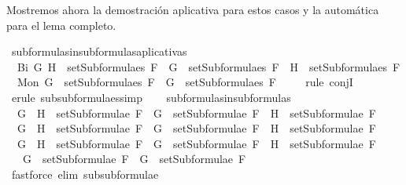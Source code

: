 \begin{isabellebody}
\begin{isamarkuptext}
Mostremos ahora la demostración aplicativa para estos casos y la automática para el lema 
completo.%
\end{isamarkuptext}\isamarkuptrue%
\isamarkupfalse%
\ subformulas{\isacharunderscore}in{\isacharunderscore}subformulas{\isacharunderscore}aplicativa{\isacharunderscore}s{\isacharcolon}\isanewline
\ \ {\isachardoublequoteopen}Bi\ G\ H\ {\isasymin}\ setSubformulae{\isacharunderscore}s\ F\ {\isasymLongrightarrow}\ G\ {\isasymin}\ setSubformulae{\isacharunderscore}s\ F\ {\isasymand}\ H\ {\isasymin}\ setSubformulae{\isacharunderscore}s\ F{\isachardoublequoteclose}\isanewline
\ \ {\isachardoublequoteopen}Mon\ G\ {\isasymin}\ setSubformulae{\isacharunderscore}s\ F\ {\isasymLongrightarrow}\ G\ {\isasymin}\ setSubformulae{\isacharunderscore}s\ F{\isachardoublequoteclose}\isanewline
%
\isadelimproof
\ \ \ %
\endisadelimproof
%
\isatagproof
{}\isamarkupfalse%
\ {\isacharparenleft}rule\ conjI{\isacharparenright}\isanewline
\ \ \ \isamarkupfalse%
\ {\isacharparenleft}erule\ subsubformulae{\isacharunderscore}s{\isacharcomma}simp{\isacharparenright}{\isacharplus}\isanewline
\ \ \isamarkupfalse%
%
\endisatagproof
{\isafoldproof}%
%
\isadelimproof
\isanewline
%
\endisadelimproof
\isanewline
{}\isamarkupfalse%
\ subformulas{\isacharunderscore}in{\isacharunderscore}subformulas{\isacharcolon}\isanewline
\ \ {\isachardoublequoteopen}G\ \isactrlbold {\isasymand}\ H\ {\isasymin}\ setSubformulae\ F\ {\isasymLongrightarrow}\ G\ {\isasymin}\ setSubformulae\ F\ {\isasymand}\ H\ {\isasymin}\ setSubformulae\ F{\isachardoublequoteclose}\isanewline
\ \ {\isachardoublequoteopen}G\ \isactrlbold {\isasymor}\ H\ {\isasymin}\ setSubformulae\ F\ {\isasymLongrightarrow}\ G\ {\isasymin}\ setSubformulae\ F\ {\isasymand}\ H\ {\isasymin}\ setSubformulae\ F{\isachardoublequoteclose}\isanewline
\ \ {\isachardoublequoteopen}G\ \isactrlbold {\isasymrightarrow}\ H\ {\isasymin}\ setSubformulae\ F\ {\isasymLongrightarrow}\ G\ {\isasymin}\ setSubformulae\ F\ {\isasymand}\ H\ {\isasymin}\ setSubformulae\ F{\isachardoublequoteclose}\isanewline
\ \ {\isachardoublequoteopen}\isactrlbold {\isasymnot}\ G\ {\isasymin}\ setSubformulae\ F\ {\isasymLongrightarrow}\ G\ {\isasymin}\ setSubformulae\ F{\isachardoublequoteclose}\isanewline
%
\isadelimproof
\ \ %
\endisadelimproof
%
\isatagproof
{}\isamarkupfalse%
\ {\isacharparenleft}fastforce\ elim{\isacharcolon}\ subsubformulae{\isacharparenright}{\isacharplus}%
\endisatagproof
{\isafoldproof}%
%
\isadelimproof
%
\endisadelimproof

\end{isabellebody}
